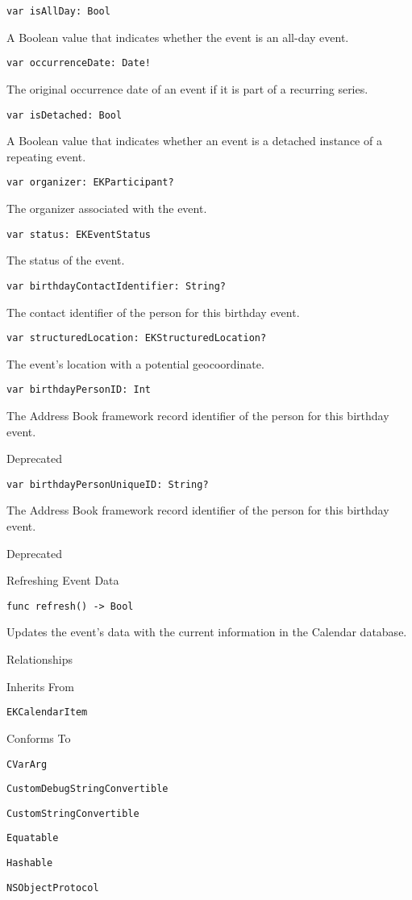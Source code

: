 \documentclass{article}
\begin{document}
\texttt{var isAllDay: Bool}

A Boolean value that indicates whether the event is an all-day event.

\texttt{var occurrenceDate: Date!}

The original occurrence date of an event if it is part of a recurring series.

\texttt{var isDetached: Bool}

A Boolean value that indicates whether an event is a detached instance of a repeating event.

\texttt{var organizer: EKParticipant?}

The organizer associated with the event.

\texttt{var status: EKEventStatus}

The status of the event.

\texttt{var birthdayContactIdentifier: String?}

The contact identifier of the person for this birthday event.

\texttt{var structuredLocation: EKStructuredLocation?}

The event's location with a potential geocoordinate.

\texttt{var birthdayPersonID: Int}

The Address Book framework record identifier of the person for this birthday event.

Deprecated

\texttt{var birthdayPersonUniqueID: String?}

The Address Book framework record identifier of the person for this birthday event.

Deprecated

Refreshing Event Data

\texttt{func refresh() -> Bool}

Updates the event's data with the current information in the Calendar database.

Relationships

Inherits From

\texttt{EKCalendarItem}

Conforms To

\texttt{CVarArg}

\texttt{CustomDebugStringConvertible}

\texttt{CustomStringConvertible}

\texttt{Equatable}

\texttt{Hashable}

\texttt{NSObjectProtocol}
\end{document}
